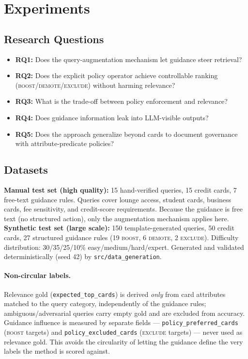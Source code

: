 \documentclass[11pt]{article}
\begin{document}
\section{Experiments}

\subsection{Research Questions}
\begin{itemize}[leftmargin=1.4em,itemsep=1pt]
  \item \textbf{RQ1:} Does the query-augmentation mechanism let guidance steer retrieval?
  \item \textbf{RQ2:} Does the explicit policy operator achieve controllable ranking
        (\textsc{boost}/\textsc{demote}/\textsc{exclude}) without harming relevance?
  \item \textbf{RQ3:} What is the trade-off between policy enforcement and relevance?
  \item \textbf{RQ4:} Does guidance information leak into LLM-visible outputs?
  \item \textbf{RQ5:} Does the approach generalize beyond cards to document governance with
        attribute-predicate policies?
\end{itemize}

\subsection{Datasets}
\textbf{Manual test set (high quality):} 15 hand-verified queries, 15 credit cards, 7 free-text
guidance rules. Queries cover lounge access, student cards, business cards, fee sensitivity,
and credit-score requirements. Because the guidance is free text (no structured action), only
the augmentation mechanism applies here.
\textbf{Synthetic test set (large scale):} 150 template-generated queries, 50 credit cards, 27
structured guidance rules (19 \textsc{boost}, 6 \textsc{demote}, 2 \textsc{exclude}). Difficulty
distribution: 30/35/25/10\% easy/medium/hard/expert. Generated and validated deterministically
(seed 42) by \texttt{src/data\_generation}.

\paragraph{Non-circular labels.} Relevance gold (\texttt{expected\_top\_cards}) is derived
\emph{only} from card attributes matched to the query category, independently of the guidance
rules; ambiguous/adversarial queries carry empty gold and are excluded from accuracy. Guidance
influence is measured by separate fields --- \texttt{policy\_preferred\_cards} (\textsc{boost}
targets) and \texttt{policy\_excluded\_cards} (\textsc{exclude} targets) --- never used as
relevance gold. This avoids the circularity of letting the guidance define the very labels the
method is scored against.
\end{document}
